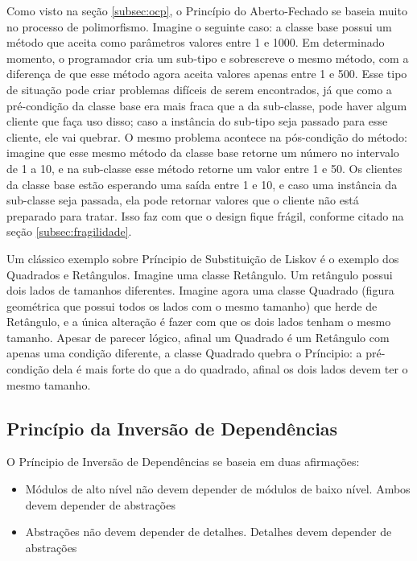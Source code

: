 Como visto na seção \ref{subsec:ocp}, o Princípio do Aberto-Fechado se baseia muito no processo de polimorfismo. Imagine o seguinte caso:
a classe base possui um método que aceita como parâmetros valores entre 1 e 1000. Em determinado momento, o programador cria um sub-tipo
e sobrescreve o mesmo método, com a diferença de que esse método agora aceita valores apenas entre 1 e 500. Esse tipo de situação pode
criar problemas difíceis de serem encontrados, já que como a pré-condição da classe base era mais fraca que a da sub-classe, pode haver
algum cliente que faça uso disso; caso a instância do sub-tipo seja passado para esse cliente, ele vai quebrar. O mesmo problema
acontece na pós-condição do método: imagine que esse mesmo método da classe base retorne um número no intervalo de 1 a 10, e na sub-classe
esse método retorne um valor entre 1 e 50. Os clientes da classe base estão esperando uma saída entre 1 e 10, e caso uma instância da
sub-classe seja passada, ela pode retornar valores que o cliente não está preparado para tratar. Isso faz com que o design fique frágil, 
conforme citado na seção \ref{subsec:fragilidade}.  

Um clássico exemplo sobre Príncipio de Substituição de Liskov é o exemplo dos Quadrados e Retângulos. Imagine uma classe Retângulo. Um
retângulo possui dois lados de tamanhos diferentes. Imagine agora uma classe Quadrado (figura geométrica que possui todos os lados
com o mesmo tamanho) que herde de Retângulo, e a única alteração é fazer com que os dois lados tenham o mesmo tamanho. Apesar
de parecer lógico, afinal um Quadrado é um Retângulo com apenas uma condição diferente, a classe Quadrado quebra o Príncipio:
a pré-condição dela é mais forte do que a do quadrado, afinal os dois lados devem ter o mesmo tamanho. 

\subsection{Princípio da Inversão de Dependências}
\label{subsec:dip}

O Príncipio de Inversão de Dependências se baseia em duas afirmações:

\begin{itemize}
	\item Módulos de alto nível não devem depender de módulos de baixo nível. Ambos devem depender de abstrações
	\item Abstrações não devem depender de detalhes. Detalhes devem depender de abstrações
\end{itemize}

